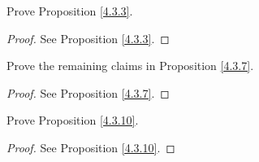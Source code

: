 \exercisesection

\begin{exercise}\label{ex 4.3.1}
Prove Proposition \ref{4.3.3}.
\end{exercise}

\begin{proof}
See Proposition \ref{4.3.3}.
\end{proof}

\begin{exercise}\label{ex 4.3.2}
Prove the remaining claims in Proposition \ref{4.3.7}.
\end{exercise}

\begin{proof}
See Proposition \ref{4.3.7}.
\end{proof}

\begin{exercise}\label{ex 4.3.3}
Prove Proposition \ref{4.3.10}.
\end{exercise}

\begin{proof}
See Proposition \ref{4.3.10}.
\end{proof}